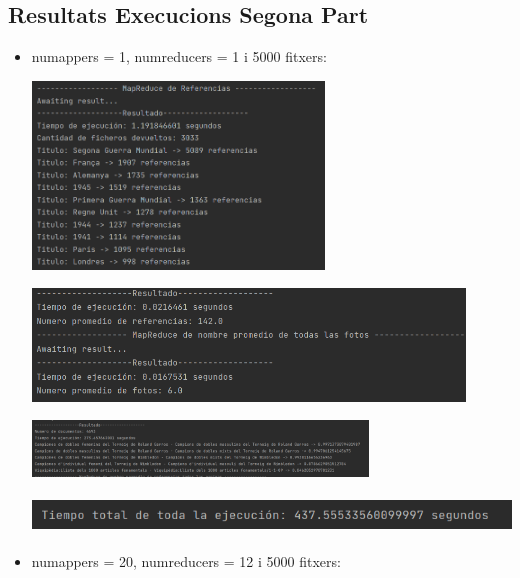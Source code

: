 \documentclass[11pt,a4paper]{article}
\begin{document}
	\subsection{Resultats Execucions Segona Part}
	
		\begin{itemize}
			\item numappers = 1, numreducers = 1 i 5000 fitxers:
			
				\begin{center}
					\includegraphics[height=5cm]{captures/segonaPart/joc1/1.png}
				\end{center}
				
				\begin{center}
					\includegraphics[height=3cm]{captures/segonaPart/joc1/2.png}
				\end{center}
				
				\begin{center}
					\includegraphics[height=1.5cm]{captures/segonaPart/joc1/3.png}
				\end{center}
				
				\begin{center}
					\includegraphics[height=1cm]{captures/segonaPart/joc1/4.png}
				\end{center}
			
			\item numappers = 20, numreducers = 12 i 5000 fitxers:
			

\end{itemize}
\end{document}
